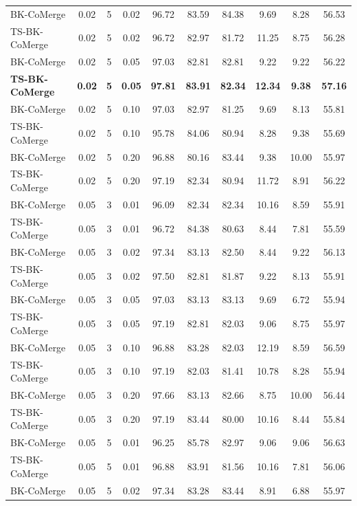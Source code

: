 \documentclass{article}
\theoremstyle{plain}
\theoremstyle{definition}
\theoremstyle{remark}
\begin{document}
\begin{table}[h]
\begin{center}
\begin{small}
\begin{tabular}{lccccccccc}
BK-CoMerge & 0.02 & 5 & 0.02 & 96.72 & 83.59 & 84.38 & 9.69 & 8.28 & 56.53 \\
TS-BK-CoMerge & 0.02 & 5 & 0.02 & 96.72 & 82.97 & 81.72 & 11.25 & 8.75 & 56.28 \\
BK-CoMerge & 0.02 & 5 & 0.05 & 97.03 & 82.81 & 82.81 & 9.22 & 9.22 & 56.22 \\
\textbf{TS-BK-CoMerge} & \textbf{0.02} & \textbf{5} & \textbf{0.05} & \textbf{97.81} & \textbf{83.91} & \textbf{82.34} & \textbf{12.34} & \textbf{9.38} & \textbf{57.16} \\
BK-CoMerge & 0.02 & 5 & 0.10 & 97.03 & 82.97 & 81.25 & 9.69 & 8.13 & 55.81 \\
TS-BK-CoMerge & 0.02 & 5 & 0.10 & 95.78 & 84.06 & 80.94 & 8.28 & 9.38 & 55.69 \\
BK-CoMerge & 0.02 & 5 & 0.20 & 96.88 & 80.16 & 83.44 & 9.38 & 10.00 & 55.97 \\
TS-BK-CoMerge & 0.02 & 5 & 0.20 & 97.19 & 82.34 & 80.94 & 11.72 & 8.91 & 56.22 \\
\midrule
BK-CoMerge & 0.05 & 3 & 0.01 & 96.09 & 82.34 & 82.34 & 10.16 & 8.59 & 55.91 \\
TS-BK-CoMerge & 0.05 & 3 & 0.01 & 96.72 & 84.38 & 80.63 & 8.44 & 7.81 & 55.59 \\
BK-CoMerge & 0.05 & 3 & 0.02 & 97.34 & 83.13 & 82.50 & 8.44 & 9.22 & 56.13 \\
TS-BK-CoMerge & 0.05 & 3 & 0.02 & 97.50 & 82.81 & 81.87 & 9.22 & 8.13 & 55.91 \\
BK-CoMerge & 0.05 & 3 & 0.05 & 97.03 & 83.13 & 83.13 & 9.69 & 6.72 & 55.94 \\
TS-BK-CoMerge & 0.05 & 3 & 0.05 & 97.19 & 82.81 & 82.03 & 9.06 & 8.75 & 55.97 \\
BK-CoMerge & 0.05 & 3 & 0.10 & 96.88 & 83.28 & 82.03 & 12.19 & 8.59 & 56.59 \\
TS-BK-CoMerge & 0.05 & 3 & 0.10 & 97.19 & 82.03 & 81.41 & 10.78 & 8.28 & 55.94 \\
BK-CoMerge & 0.05 & 3 & 0.20 & 97.66 & 83.13 & 82.66 & 8.75 & 10.00 & 56.44 \\
TS-BK-CoMerge & 0.05 & 3 & 0.20 & 97.19 & 83.44 & 80.00 & 10.16 & 8.44 & 55.84 \\
\midrule
BK-CoMerge & 0.05 & 5 & 0.01 & 96.25 & 85.78 & 82.97 & 9.06 & 9.06 & 56.63 \\
TS-BK-CoMerge & 0.05 & 5 & 0.01 & 96.88 & 83.91 & 81.56 & 10.16 & 7.81 & 56.06 \\
BK-CoMerge & 0.05 & 5 & 0.02 & 97.34 & 83.28 & 83.44 & 8.91 & 6.88 & 55.97 \\

\end{tabular}
\end{small}
\end{center}
\end{table}
\end{document}
